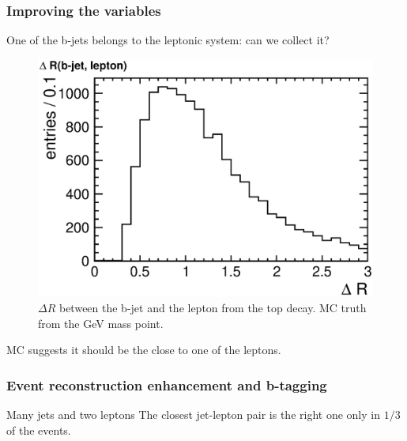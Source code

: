 \documentclass[ukenglish]{beamer}
\begin{document}
\begin{frame}
    \frametitle{Improving the variables}
    One of the b-jets belongs to the leptonic system: can we collect it?
    \begin{figure}[h]
        \centering
        \includegraphics[height=.6\textheight]{signal_mc_dr_jet_lepton.eps}
        \caption{$\Delta R$ between the b-jet and the lepton from the top
            decay. MC truth from the \unit[550]{GeV} mass point.}
    \end{figure}
    MC suggests it should be the close to one of the leptons.
\end{frame}

\begin{frame}
    \frametitle{Event reconstruction enhancement and b-tagging}
    \begin{block}
        {Many jets and two leptons}
        The closest jet-lepton pair is the right one only in $1/3$ of the
        events.
    \end{block}

\end{frame}
\end{document}
